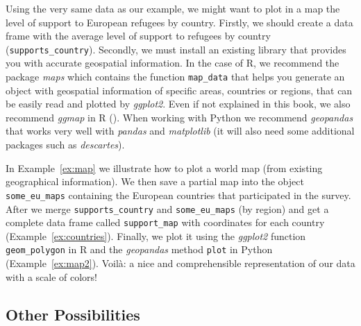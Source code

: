 Using the very same data 
as our example, we might want to plot in a map the level of support to European refugees by country. Firstly, we should create a data frame with the average level of support to refugees by country (\texttt{supports\_country}). Secondly, we must install an existing library that provides you with accurate geospatial information. In the case of R, we recommend the package \emph{maps} which contains the function \texttt{map\_data} that helps you generate an object with geospatial information of specific areas, countries or regions, that can be easily read and plotted by \emph{ggplot2}. Even if not explained in this book, we also recommend \emph{ggmap} in R (\cite{kahle2013ggmap}). When working with Python we recommend \emph{geopandas} that works very well with \emph{pandas} and \emph{matplotlib} (it will also need some additional packages such as \emph{descartes}).

In Example~\ref{ex:map} we illustrate how to plot a world map (from existing geographical information).
We then save a partial map into the object \texttt{some\_eu\_maps} containing the European countries that participated in the survey. After we merge \texttt{supports\_country} and \texttt{some\_eu\_maps} (by region) and get a complete data frame called \texttt{support\_map} with coordinates for each country (Example~\ref{ex:countries}).
Finally, we plot it using the \emph{ggplot2} function \texttt{geom\_polygon} in R and the \emph{geopandas} method \texttt{plot} in Python (Example~\ref{ex:map2}). Voil\`a: a nice and comprehensible representation of our data with a scale of colors!





\subsection{Other Possibilities}

